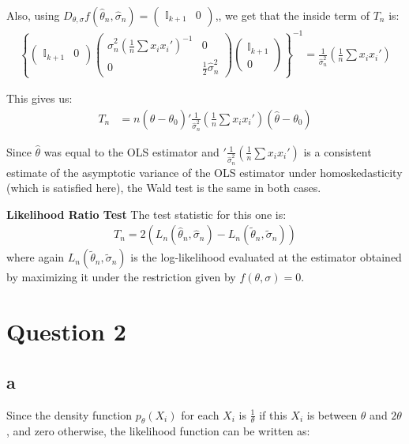 \documentclass[12pt]{paper}
\begin{document}
Also, using $D_{\theta,\sigma}f(\hat{\theta}_n,\hat{\sigma}_n)=\begin{pmatrix}
\mathbb{I}_{k+1}&0
\end{pmatrix}$,, we get that the inside term of $T_n$ is:
\begin{align*}
\left\{\begin{pmatrix}
\mathbb{I}_{k+1}&0
\end{pmatrix} 
\begin{pmatrix}
\hat{\sigma}_n^2\left(\frac{1}{n}\sum{x_ix_i'}\right)^{-1} & 0\\
0 & \frac{1}{2}\hat{\sigma}_n^2
\end{pmatrix}
\begin{pmatrix}
\mathbb{I}_{k+1}\\
0
\end{pmatrix}  \right\}^{-1}=\frac{1}{\hat{\sigma}_n^2}\left(\frac{1}{n}\sum{x_ix_i'}\right)
\end{align*} 

This gives us:
\begin{align*}
T_n&=n(\hat{\theta}-\theta_0)'\frac{1}{\hat{\sigma}_n^2}\left(\frac{1}{n}\sum{x_ix_i'}\right)(\hat{\theta}-\theta_0)
\end{align*}

Since $\hat{\theta}$ was equal to the OLS estimator and $'\frac{1}{\hat{\sigma}_n^2}\left(\frac{1}{n}\sum{x_ix_i'}\right)$ is a consistent estimate of the asymptotic variance of the OLS estimator under homoskedasticity (which is satisfied here), the Wald test is the same in both cases.

\textbf{Likelihood Ratio Test}
The test statistic for this one is:
\begin{align*}
T_n=2\left(L_n(\hat{\theta}_n,\hat{\sigma}_n)-L_n(\tilde{\theta}_n,\tilde{\sigma}_n)\right)
\end{align*}
\noindent where again $L_n(\tilde{\theta}_n,\tilde{\sigma}_n)$ is the log-likelihood evaluated at the estimator obtained by maximizing it under the restriction given by $f(\theta,\sigma)=0$.

\section*{Question 2}

\subsection*{a}

Since the density function $p_\theta(X_i)$ for each $X_i$ is $\frac{1}{\theta}$ if this $X_i$ is between $\theta$ and $2\theta$, and zero otherwise, the likelihood function can be written as:
\end{document}
